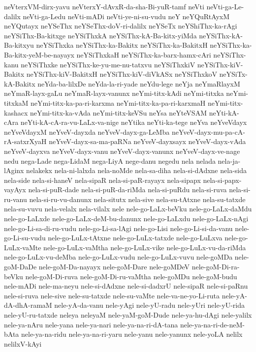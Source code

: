 {neVterxVM-dirx-yavu
neVterxY-dAvxR-da-sha-Bi-yuR-tamf
neVti
neVti-ga-Le-dalilx
neVti-ga-Ledu
neVti-mADi
neVti-ye-ni-su-vudu
neY
neYQuRtAyxM
neYQutayx
neYSeThx
neYSeThx-doV-ri-dalilx
neYSeTx
neYShiThx-ka-rAgi
neYSiThx-Ba-kitxge
neYSiThxkA
neYSiThx-kA-Ba-kitx-yiMda
neYSiThx-kA-Ba-kitxyu
neYSiThxka
neYSiThx-ka-Bakitx
neYSiThx-ka-BakitxH
neYSiThx-ka-Ba-kitx-yeM-be-nayayx
neYSiThxkaH
neYSiThx-ka-barx-hamx-cAri
neYSiThx-kanu
neYSiThxke
neYSiThx-ke-yu-me-nu-tatxvu
neYSiThxkiV
neYSiThx-kiV-Bakitx
neYSiThx-kiV-BakitxH
neYSiThx-kiV-diVkASx
neYSiThxkoV
neYSiTx-kA-Bakitx
neYda-ba-lilxDe
neYda-la-ri-yade
neYdu-lege
neYja
neYmaRlayxM
neYmaR-layx-gaLu
neYmaR-layx-vanunx
neYmi-titx-kAdi
neYmi-titxka
neYmi-titxkaM
neYmi-titx-ka-pa-ri-karxma
neYmi-titx-ka-pa-ri-karxmaH
neYmi-titx-kashacx
neYmi-titx-ka-vAda
neYmi-titx-keVSu
neYsa
neYteVSAM
neYti-kA-cAra
neYti-kA-cA-ra-vu-LaLx-va-nige
neYtika
neYti-ka-tege
neYva
neYveVdayx
neYveVdayxM
neYveV-dayxda
neYveV-dayx-ga-LeMba
neYveV-dayx-mu-pa-cA-rA-satxrXyaH
neYveV-dayx-sa-ma-paRNa
neYveV-dayxsayx
neYveV-dayx-vAda
neYveV-dayxva
neYveV-dayx-vanu
neYveV-dayx-vanunx
neYveV-dayx-ve-nage
nedu
nega-Lade
nega-LidaM
nega-LiyA
nege-danu
negedu
nela
nelada
nela-ja-lAginx
nelakekx
nela-ni-lalxda
nela-noMde
nela-sa-diha
nela-si-dAdxne
nela-sida
nela-side
nela-si-haneV
nela-sipaR
nela-si-paR-rayayx
nela-sipapx
nela-si-papx-vayAyx
nela-si-puR-dade
nela-si-puR-da-riMda
nela-si-puRdu
nela-si-ruva
nela-si-ru-vanu
nela-si-ru-vu-danunx
nela-situtx
nela-sive
nela-su-tAtxne
nela-su-tatxde
nela-su-vuvu
nela-velalx
nela-vilalx
nele
nele-go-LaLx-beVku
nele-go-LaLx-daMdu
nele-go-LaLxde
nele-go-LaLx-deM-bu-danunx
nele-go-LaLxdu
nele-go-LaLx-nAgi
nele-go-Li-sa-di-ru-vudu
nele-go-Li-sa-lAgi
nele-go-Lisi
nele-go-Li-si-da-vanu
nele-go-Li-su-vudu
nele-go-LuLx-tAtxne
nele-go-LuLx-tatxde
nele-go-LuLxva
nele-go-LuLx-vaMte
nele-go-LuLx-vaMtha
nele-go-LuLx-vike
nele-go-LuLx-vu-da-riMda
nele-go-LuLx-vu-deMba
nele-go-LuLx-vudu
nele-go-LuLx-vuvu
nele-goMDa
nele-goM-DaDe
nele-goM-Da-nayayx
nele-goM-Dare
nele-goMDeV
nele-goM-Di-ra-beVku
nele-goM-Di-ruva
nele-goM-Di-ru-vaMtha
nele-goMDu
nele-goM-budu
nele-mADi
nele-ma-neyu
nele-si-dAdxne
nele-si-dadxrU
nele-sipaR
nele-si-paRnu
nele-si-ruva
nele-sive
nele-su-tatxde
nele-su-vaMte
nele-va-ne-yo-Li-ruta
nele-yA-dA-dhA-ramaM
nele-yA-da-vanu
nele-yAgi
nele-yU-radu
nele-yUri
nele-yU-rida
nele-yU-ru-tatxde
neleya
neleyaM
nele-yaM-goM-Dude
nele-ya-hu-dAgi
nele-yalilx
nele-ya-nAru
nele-yana
nele-ya-nari
nele-ya-na-ri-dA-tana
nele-ya-na-ri-de-neM-bAta
nele-ya-na-ridu
nele-ya-na-ri-yaru
nele-yanu
nele-yanunx
nele-yoLA
nelilx
nelilxV-kAyi
}
